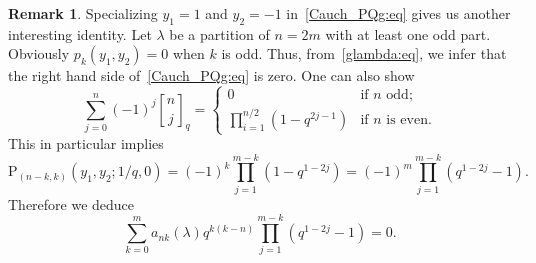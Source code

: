 \documentclass[12pt,a4paper,reqno]{amsart}
\theoremstyle{plain}
\theoremstyle{definition}
\newtheorem{remark}[theorem]{Remark}
\newcommand{\1}{\mathds{1}}
\renewcommand{\P}{\mathrm{P}}
\begin{document}
\begin{remark} Specializing $y_1=1$ and $y_2=-1$ in~\cref{Cauch_PQg:eq} gives us another interesting identity. Let $\lambda$ be a partition of $n=2m$ with at least one odd part. Obviously $p_k(y_1,y_2)=0$ when $k$ is odd. Thus, from~\cref{glambda:eq}, we infer that the right hand side of~\cref{Cauch_PQg:eq} is zero. One can also show
$$
\sum_{j=0}^n (-1)^j{n\brack j}_q=
\begin{cases}
    0 & \text{if $n$ odd};\\
    \prod_{i=1}^{n/2}(1-q^{2j-1}) & \text{if $n$ is even}.
\end{cases}
$$
This in particular implies 
$$
\P_{(n-k,k)}(y_1,y_2;1/q,0)=(-1)^k\prod_{j=1}^{m-k}\left(1-q^{1-2j}\right)=(-1)^m\prod_{j=1}^{m-k}\left(q^{1-2j}-1\right)
.$$
Therefore we deduce 
$$
\sum_{k=0}^{m}a_{nk}(\lambda)q^{k(k-n)}\prod_{j=1}^{m-k}\left(q^{1-2j}-1\right)=0
.$$
\end{remark}
\end{document}

